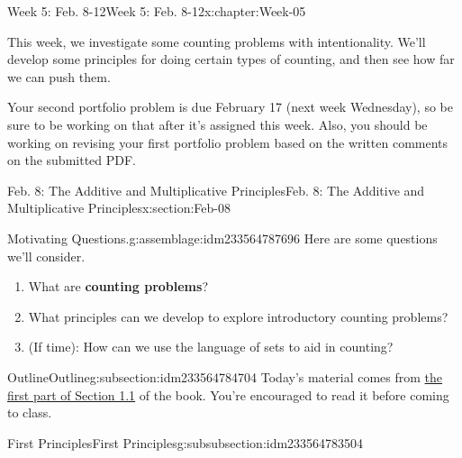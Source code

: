 \documentclass[oneside,10pt,]{book}
\newcommand{\terminology}[1]{\textbf{#1}}
\numberwithin{equation}{section}
\begin{document}
\begin{chapterptx}{Week 5: Feb. 8-12}{}{Week 5: Feb. 8-12}{}{}{x:chapter:Week-05}
\begin{introduction}{}%
This week, we investigate some counting problems with intentionality. We'll develop some principles for doing certain types of counting, and then see how far we can push them.%
\par
Your second portfolio problem is due February 17 (next week Wednesday), so be sure to be working on that after it's assigned this week. Also, you should be working on revising your first portfolio problem based on the written comments on the submitted PDF.%
\end{introduction}%
%
%
\typeout{************************************************}
\typeout{************************************************}
%
\begin{sectionptx}{Feb. 8: The Additive and Multiplicative Principles}{}{Feb. 8: The Additive and Multiplicative Principles}{}{}{x:section:Feb-08}
\begin{introduction}{}%
\begin{assemblage}{Motivating Questions.}{g:assemblage:idm233564787696}%
Here are some questions we'll consider. %
\begin{enumerate}
\item{}What are \terminology{counting problems}?%
\item{}What principles can we develop to explore introductory counting problems?%
\item{}(If time): How can we use the language of sets to aid in counting?%
\end{enumerate}
%
\end{assemblage}
\end{introduction}%
%
%
\typeout{************************************************}
\typeout{************************************************}
%
\begin{subsectionptx}{Outline}{}{Outline}{}{}{g:subsection:idm233564784704}
Today's material comes from \href{http://discrete.openmathbooks.org/dmoi3/sec_counting-addmult.html}{the first part of Section 1.1} of the book. You're encouraged to read it before coming to class.%
%
%
\typeout{************************************************}
\typeout{************************************************}
%
\begin{subsubsectionptx}{First Principles}{}{First Principles}{}{}{g:subsubsection:idm233564783504}

\end{subsubsectionptx}
\end{subsectionptx}
\end{sectionptx}
\end{chapterptx}
\end{document}
